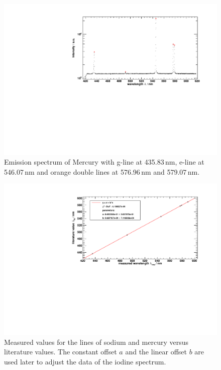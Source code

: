 \begin{figure}[H]
\begin{center}
  \includegraphics[width=\textwidth]{../img/HgPeaks.pdf}
  \caption[---]{Emission spectrum of Mercury with
  g-line at 435.83\,nm,
  e-line at 546.07\,nm and
  orange double lines at 576.96\,nm and 579.07\,nm.}
  \label{img:hg:spectrum}
\end{center}
\end{figure}

\begin{figure}[H]
\begin{center}
  \includegraphics[width=\textwidth]{../img/energy_gauge.pdf}
  \caption[---]{Measured values for the lines of sodium and mercury versus literature values.
  The constant offset $a$ and the linear offset $b$ are used later to adjust the data of the iodine spectrum.}
  \label{img:calibrationsystem}
\end{center}
\end{figure}

